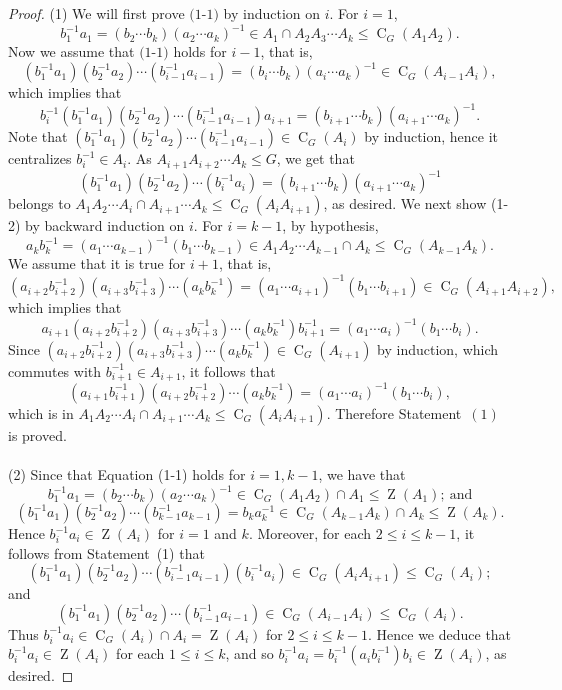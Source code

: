 \documentclass[10pt,a4paper]{amsart}
\DeclareMathOperator{\C}{C}
\DeclareMathOperator{\Z}{Z}
\begin{document}
\begin{proof}
(1) We will first prove $\text{(1-1)}$ by induction on $i$. For $i=1$,
$$b_1^{-1}a_1=(b_{2}\cdots b_k)(a_{2}\cdots a_k)^{-1} \in A_1 \cap A_{2}A_3\cdots A_k \leq \C_G(A_1A_{2}).$$
Now we assume that $\text{(1-1)}$ holds for $i-1$, that is,  $$(b_1^{-1}a_1)(b_2^{-1}a_2)\cdots (b_{i-1}^{-1}a_{i-1})=(b_{i}\cdots b_k)(a_{i}\cdots a_k)^{-1} \in \C_G(A_{i-1}A_{i}),$$
which implies that
$$b_i^{-1}(b_1^{-1}a_1)(b_2^{-1}a_2)\cdots (b_{i-1}^{-1}a_{i-1})a_{i+1}=(b_{i+1}\cdots b_k)(a_{i+1}\cdots a_k)^{-1}. $$
Note that $(b_1^{-1}a_1)(b_2^{-1}a_2)\cdots (b_{i-1}^{-1}a_{i-1}) \in \C_G(A_i)$ by induction, hence it centralizes $b_i^{-1} \in A_i$. As $A_{i+1}A_{i+2} \cdots A_k \leq G$,  we get that
$$(b_1^{-1}a_1)(b_2^{-1}a_2)\cdots (b_i^{-1}a_i)=(b_{i+1}\cdots b_k)(a_{i+1}\cdots a_k)^{-1}$$
belongs to $A_1A_2\cdots A_i \cap A_{i+1}\cdots A_k \leq \C_G(A_iA_{i+1})$, as desired.
We next show (1-2) by backward induction on $i$. For $i=k-1$, by hypothesis,
$$a_kb_k^{-1}=(a_{1}\cdots a_{k-1})^{-1} (b_{1}\cdots b_{k-1}) \in A_1A_2\cdots A_{k-1} \cap A_k \leq \C_G(A_{k-1}A_k).$$
We assume that it is true for $i+1$, that is,
$$(a_{i+2}b_{i+2}^{-1})(a_{i+3}b_{i+3}^{-1})\cdots (a_kb_k^{-1})=(a_{1}\cdots a_{i+1})^{-1} (b_{1}\cdots b_{i+1}) \in \C_G(A_{i+1}A_{i+2}),$$
which implies that
$$a_{i+1}(a_{i+2}b_{i+2}^{-1})(a_{i+3}b_{i+3}^{-1})\cdots (a_kb_k^{-1})b_{i+1}^{-1}=(a_{1}\cdots a_{i})^{-1} (b_{1}\cdots b_{i}).$$
Since $(a_{i+2}b_{i+2}^{-1})(a_{i+3}b_{i+3}^{-1})\cdots (a_kb_k^{-1}) \in \C_G(A_{i+1})$ by induction, which commutes with $b_{i+1}^{-1} \in A_{i+1}$, it follows that
$$(a_{i+1}b_{i+1}^{-1})(a_{i+2}b_{i+2}^{-1})\cdots (a_kb_k^{-1})=(a_{1}\cdots a_{i})^{-1} (b_{1}\cdots b_{i}),$$
which is in $A_1 A_2\cdots A_i \cap A_{i+1} \cdots A_k \leq
\C_G(A_iA_{i+1})$. Therefore Statement~$(1)$ is proved.
\\
\\
(2) Since that Equation (1-1) holds for $i=1,k-1$, we have that
$$b_1^{-1}a_1=(b_{2}\cdots b_k)(a_{2}\cdots a_k)^{-1} \in \C_G(A_1A_{2}) \cap A_1 \leq \Z(A_1);~\text{and}$$
$$(b_1^{-1}a_1)(b_2^{-1}a_2)\cdots (b_{k-1}^{-1}a_{k-1})=b_ka_k^{-1} \in \C_G(A_{k-1}A_{k}) \cap A_k \leq \Z(A_k).$$
Hence $b_i^{-1}a_i \in \Z(A_i)$ for $i=1$ and $k$. Moreover, for each $2\leq i \leq k-1$, it follows from Statement~(1) that
$$(b_1^{-1}a_1)(b_2^{-1}a_2)\cdots(b_{i-1}^{-1}a_{i-1}) (b_i^{-1}a_i) \in \C_G(A_iA_{i+1}) \leq \C_G(A_i);$$
and
$$(b_1^{-1}a_1)(b_2^{-1}a_2)\cdots(b_{i-1}^{-1}a_{i-1}) \in \C_G(A_{i-1}A_i) \leq \C_G(A_i).$$
Thus $b_i^{-1}a_i \in \C_G(A_i) \cap A_i=\Z(A_i)$ for $2\leq i \leq k-1$.  Hence we deduce that $b_i^{-1}a_i \in \Z(A_i)$ for each $1 \leq i \leq k$, and so $b_i^{-1}a_i=b^{-1}_i(a_ib_i^{-1})b_i \in \Z(A_i)$, as desired.

\end{proof}
\end{document}
